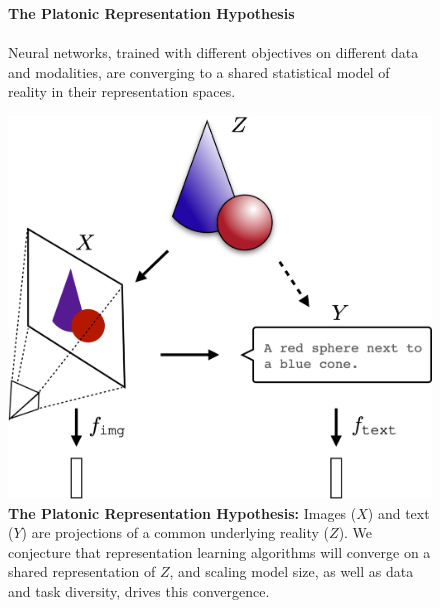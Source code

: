 \documentclass{article}
\newcommand{\fixme}[1]{{\bf\color{red}FIXME: #1}}
\newcommand{\hypbox}[2]{%
\begin{tcolorbox}[colback=white!98!black,colframe=white!30!black,boxsep=1.1pt,top=6.75pt]%
\vspace{1.75pt}%
\textbf{#1}\\[-0.575em]
\noindent\makebox[\textwidth]{\rule{\textwidth}{0.4pt}}
\\[0.25em]
#2
\end{tcolorbox}
}
\theoremstyle{plain}
\theoremstyle{definition}
\theoremstyle{remark}
\begin{document}
\begin{figure}[t]
    \centering
    \hypbox{The Platonic Representation Hypothesis}{%
    Neural networks, trained with different objectives on different data and modalities, are converging to a shared statistical model of reality in their representation spaces.}%
    \vspace{3pt}%
    \includegraphics[width=0.85\linewidth]{figures/platonic_rep_less_space_v3.pdf}\vspace*{-5.5pt}
    \caption{\small \textbf{The Platonic Representation Hypothesis:} Images ($X$) and text ($Y$) are projections of a common underlying reality ($Z$). We conjecture that representation learning algorithms will converge on a shared representation of $Z$, and scaling model size, as well as data and task diversity, drives this convergence. %
    }\label{fig:platonic_rep}
\end{figure}
\end{document}
